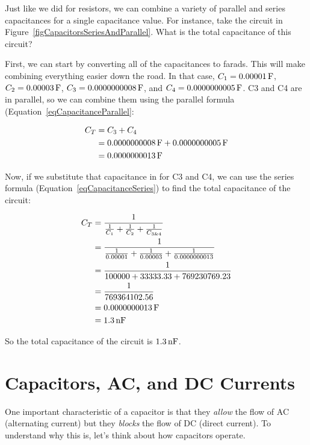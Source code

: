 \begin{exampleprob}
Just like we did for resistors, we can combine a variety of parallel and series capacitances for a single capacitance value.  For instance, take the circuit in Figure~\ref{figCapacitorsSeriesAndParallel}.  What is the total capacitance of this circuit?


First, we can start by converting all of the capacitances to farads.
This will make combining everything easier down the road.
In that case, $C_1 = 0.00001\,\si{\farad}$, $C_2 = 0.00003\,\si{\farad}$, $C_3 = 0.0000000008\,\si{\farad}$, and $C_4 = 0.0000000005\,\si{\farad}$.
C3 and C4 are in parallel, so we can combine them using the parallel formula (Equation~\ref{eqCapacitanceParallel}:

\begin{align*}
C_T &= C_3 + C_4 \\
    &= 0.0000000008\,\si{\farad} + 0.0000000005\,\si{\farad} \\
    &= 0.0000000013\,\si{\farad}
\end{align*}

Now, if we substitute that capacitance in for C3 and C4, we can use the series formula (Equation~\ref{eqCapacitanceSeries}) to find the total capacitance of the circuit:

\begin{align*}
C_T &= \frac{1}{\frac{1}{C_1} + \frac{1}{C_2} + \frac{1}{C_{3\&4}}} \\
    &= \frac{1}{\frac{1}{0.00001} + \frac{1}{0.00003} + \frac{1}{0.0000000013}} \\
    &= \frac{1}{100000 + 33333.33 + 769230769.23} \\
    &= \frac{1}{769364102.56} \\
    &= 0.0000000013\,\si{\farad} \\
    &= 1.3\,\si{\nano\farad} 
\end{align*}

So the total capacitance of the circuit is $1.3\,\si{\nano\farad}$.
\end{exampleprob}

\section{Capacitors, AC, and DC Currents}

One important characteristic of a capacitor is that they \emph{allow} the flow of AC (alternating current) but they \emph{blocks} the flow of DC (direct current).
To understand why this is, let's think about how capacitors operate.

